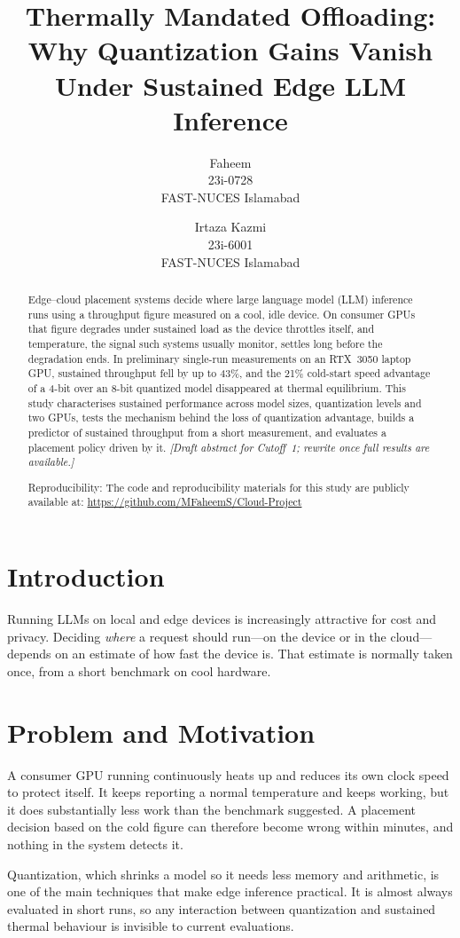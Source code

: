 \documentclass[11pt,a4paper]{article}
\title{Thermally Mandated Offloading: Why Quantization Gains Vanish\\ Under Sustained Edge LLM Inference}
\author{
  Faheem \\ 23i-0728 \\ FAST-NUCES Islamabad
  \and
  Irtaza Kazmi \\ 23i-6001 \\ FAST-NUCES Islamabad
}
\date{}
\begin{document}
\maketitle

\begin{abstract}
Edge--cloud placement systems decide where large language model (LLM) inference
runs using a throughput figure measured on a cool, idle device. On consumer GPUs
that figure degrades under sustained load as the device throttles itself, and
temperature, the signal such systems usually monitor, settles long before the
degradation ends. In preliminary single-run measurements on an RTX~3050 laptop
GPU, sustained throughput fell by up to 43\%, and the 21\% cold-start speed
advantage of a 4-bit over an 8-bit quantized model disappeared at thermal
equilibrium. This study characterises sustained performance across model sizes,
quantization levels and two GPUs, tests the mechanism behind the loss of
quantization advantage, builds a predictor of sustained throughput from a short
measurement, and evaluates a placement policy driven by it.
\textit{[Draft abstract for Cutoff~1; rewrite once full results are available.]}

Reproducibility: The code and reproducibility materials for this study are
publicly available at: \url{https://github.com/MFaheemS/Cloud-Project}
\end{abstract}

\section{Introduction}
Running LLMs on local and edge devices is increasingly attractive for cost and
privacy. Deciding \emph{where} a request should run---on the device or in the
cloud---depends on an estimate of how fast the device is. That estimate is
normally taken once, from a short benchmark on cool hardware.

\section{Problem and Motivation}
A consumer GPU running continuously heats up and reduces its own clock speed to
protect itself. It keeps reporting a normal temperature and keeps working, but it
does substantially less work than the benchmark suggested. A placement decision
based on the cold figure can therefore become wrong within minutes, and nothing
in the system detects it.

Quantization, which shrinks a model so it needs less memory and arithmetic, is
one of the main techniques that make edge inference practical. It is almost
always evaluated in short runs, so any interaction between quantization and
sustained thermal behaviour is invisible to current evaluations.
\end{document}
